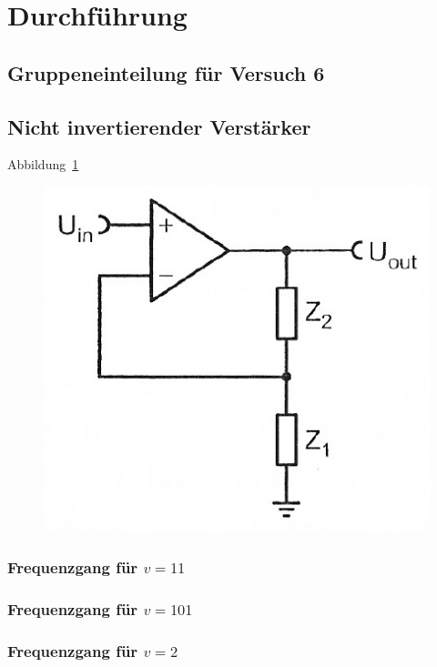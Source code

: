 
\FloatBarrier
\section{Durchführung}

\FloatBarrier
\subsection{Gruppeneinteilung für Versuch 6}

\FloatBarrier
\subsection{Nicht invertierender Verstärker}

Abbildung~\ref{fig:5_6-4}

\begin{figure}[htbp]
	\centering
	\includegraphics[width=.6\linewidth]{Anleitung/5_6-4.png}
	\caption{%
		\cite[Abbildung~5/6.4]{physik313-Anleitung}
	}
	\label{fig:5_6-4}
\end{figure}

\subsubsection{Frequenzgang für $v = 11$}

\subsubsection{Frequenzgang für $v = 101$}

\subsubsection{Frequenzgang für $v = 2$}

